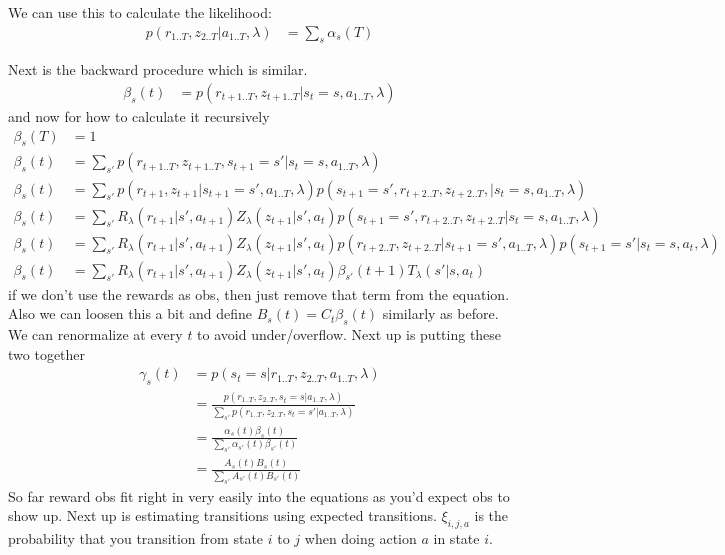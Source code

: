 \documentclass[10pt,english]{article}
\begin{document}
We can use this to calculate the likelihood:
\begin{align}
p(r_{1..T},z_{2..T}|a_{1..T},\lambda) &= \sum_{s} \alpha_s(T)
\end{align}

Next is the backward procedure which is similar.
\begin{align}
\beta_s(t) &= p(r_{t+1..T},z_{t+1..T}|s_t=s,a_{1..T},\lambda)
\end{align}
and now for how to calculate it recursively
\begin{align}
\beta_s(T) &= 1\\ 
\beta_s(t) &= \sum_{s'} p(r_{t+1..T},z_{t+1..T},s_{t+1}=s'|s_t=s,a_{1..T},\lambda) \\
\beta_s(t) &= \sum_{s'} p(r_{t+1},z_{t+1}|s_{t+1}=s',a_{1..T},\lambda) p(s_{t+1}=s',r_{t+2..T},z_{t+2..T},|s_t=s,a_{1..T},\lambda) \\
\beta_s(t) &= \sum_{s'} R_\lambda(r_{t+1}|s',a_{t+1}) Z_\lambda(z_{t+1}|s',a_t) p(s_{t+1}=s',r_{t+2..T},z_{t+2..T}|s_t=s,a_{1..T},\lambda) \\
\beta_s(t) &= \sum_{s'} R_\lambda(r_{t+1}|s',a_{t+1}) Z_\lambda(z_{t+1}|s',a_t) p(r_{t+2..T},z_{t+2..T}|s_{t+1}=s',a_{1..T},\lambda) p(s_{t+1}=s'|s_t=s,a_{t},\lambda) \\
\beta_s(t) &= \sum_{s'} R_\lambda(r_{t+1}|s',a_{t+1}) Z_\lambda(z_{t+1}|s',a_t) \beta_{s'}(t+1) T_\lambda(s'|s,a_t)
\end{align}
if we don't use the rewards as obs, then just remove that term from the equation. Also we can loosen this a bit and define $B_s(t) = C_t \beta_s(t)$ similarly as before. We can renormalize at every $t$ to avoid under/overflow. Next up is putting these two together
\begin{align}
\gamma_s(t) &= p(s_t=s|r_{1..T},z_{2..T},a_{1..T},\lambda) \\
&= \frac{p(r_{1..T},z_{2..T},s_t=s|a_{1..T},\lambda)}{\sum_{s'} p(r_{1..T},z_{2..T},s_t=s'|a_{1..T},\lambda)} \\
&= \frac{\alpha_s(t)\beta_s(t)}{\sum_{s'} \alpha_{s'}(t)\beta_{s'}(t)} \\
&= \frac{A_s(t)B_s(t)}{\sum_{s'} A_{s'}(t)B_{s'}(t)}
\end{align}
So far reward obs fit right in very easily into the equations as you'd expect obs to show up. Next up is estimating transitions using expected transitions. \(\xi_{i,j,a}\) is the probability that you transition from state $i$ to $j$ when doing action $a$ in state $i$.
\end{document}

